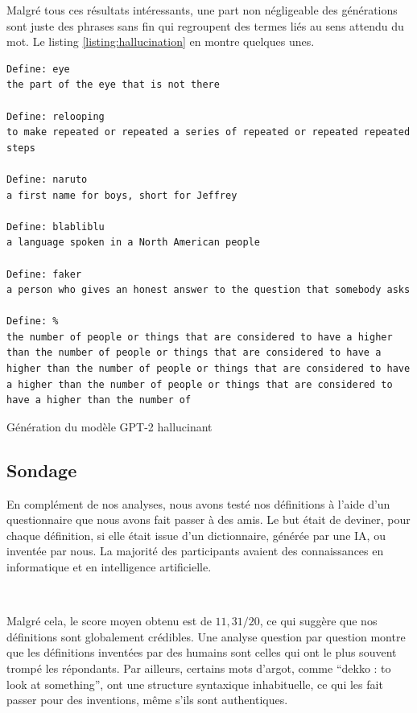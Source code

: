 \documentclass[french]{template}
\begin{document}
Malgré tous ces résultats intéressants, une part non négligeable des générations sont juste des phrases sans fin qui regroupent des termes liés au sens attendu du mot. Le listing \ref{listing:hallucination} en montre quelques unes.

\begin{listing}[H]
    \begin{verbatim}
Define: eye
the part of the eye that is not there

Define: relooping
to make repeated or repeated a series of repeated or repeated repeated steps

Define: naruto
a first name for boys, short for Jeffrey

Define: blabliblu
a language spoken in a North American people

Define: faker
a person who gives an honest answer to the question that somebody asks

Define: %
the number of people or things that are considered to have a higher than the number of people or things that are considered to have a higher than the number of people or things that are considered to have a higher than the number of people or things that are considered to have a higher than the number of
    \end{verbatim}
    \caption{Génération du modèle GPT-2 hallucinant}
    \label{listing:hallucination}
\end{listing}

\subsection{Sondage}

En complément de nos analyses, nous avons testé nos définitions à l'aide d'un questionnaire que nous avons fait passer à des amis. Le but était de deviner, pour chaque définition, si elle était issue d'un dictionnaire, générée par une IA, ou inventée par nous. La majorité des participants avaient des connaissances en informatique et en intelligence artificielle.

\

Malgré cela, le score moyen obtenu est de $11,31/20$, ce qui suggère que nos définitions sont globalement crédibles. Une analyse question par question montre que les définitions inventées par des humains sont celles qui ont le plus souvent trompé les répondants. Par ailleurs, certains mots d'argot, comme “dekko : to look at something”, ont une structure syntaxique inhabituelle, ce qui les fait passer pour des inventions, même s'ils sont authentiques.
\end{document}
